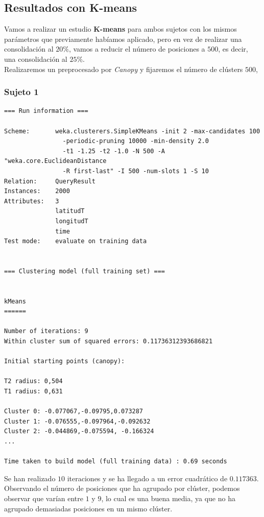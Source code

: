 \documentclass[a4paper, 12pt]{article}
\begin{document}
\subsection{Resultados con K-means}

Vamos a realizar un estudio \textbf{K-means} para ambos sujetos con los mismos par\'ametros que previamente hab\'iamos aplicado, pero en vez de realizar una consolidaci\'on al $20\%$, vamos a reducir el n\'umero de posiciones a $500$, es decir, una consolidaci\'on al $25\%$. \\

Realizaremos un preprocesado por \textit{Canopy} y fijaremos el n\'umero de cl\'usters $500$,

\subsubsection{Sujeto 1}

\begin{verbatim}
=== Run information ===

Scheme:       weka.clusterers.SimpleKMeans -init 2 -max-candidates 100 
				-periodic-pruning 10000 -min-density 2.0 
				-t1 -1.25 -t2 -1.0 -N 500 -A "weka.core.EuclideanDistance 
				-R first-last" -I 500 -num-slots 1 -S 10
Relation:     QueryResult
Instances:    2000
Attributes:   3
              latitudT
              longitudT
              time
Test mode:    evaluate on training data


=== Clustering model (full training set) ===


kMeans
======

Number of iterations: 9
Within cluster sum of squared errors: 0.11736312393686821

Initial starting points (canopy):

T2 radius: 0,504     
T1 radius: 0,631  

Cluster 0: -0.077067,-0.09795,0.073287
Cluster 1: -0.076555,-0.097964,-0.092632
Cluster 2: -0.044869,-0.075594, -0.166324
...

Time taken to build model (full training data) : 0.69 seconds
\end{verbatim}

Se han realizado $10$ iteraciones y se ha llegado a un error cuadr\'atico de $0.117363$. Observando el n\'umero de posiciones que ha agrupado por cl\'uster, podemos observar que var\'ian entre $1$ y $9$, lo cual es una buena media, ya que no ha agrupado demasiadas posiciones en un mismo cl\'uster. \\ 
\end{document}
